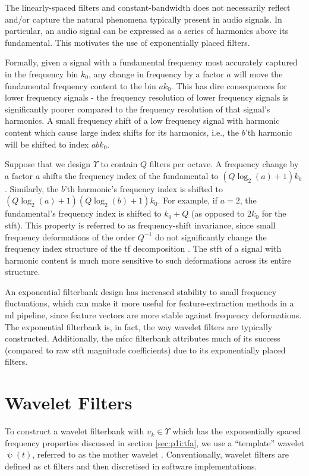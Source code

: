 The linearly-spaced filters and constant-bandwidth does not necessarily reflect and/or capture the natural phenomena typically present in audio signals. In particular, an audio signal can be expressed as a series of harmonics above its fundamental. This motivates the use of exponentially placed filters.

Formally, given a signal with a fundamental frequency most accurately captured in the frequency bin $k_0$, any change in frequency by a factor $a$ will move the fundamental frequency content to the bin $a k_0$. This has dire consequences for lower frequency signals - the frequency resolution of lower frequency signals is significantly poorer compared to the frequency resolution of that signal's harmonics. A small frequency shift of a low frequency signal with harmonic content which cause large index shifts for its harmonics, i.e., the $b$'th harmonic will be shifted to index $a b k_0$.

Suppose that we design $\Upsilon$ to contain $Q$ filters per octave. A frequency change by a factor $a$ shifts the frequency index of the fundamental to $(Q\log_2 (a) + 1) k_0$. Similarly, the $b$'th harmonic's frequency index is shifted to $(Q\log_2 (a) + 1) (Q\log_2 (b) + 1) k_0$. For example, if $a=2$, the fundamental's frequency index is shifted to $k_0 + Q$ (as opposed to $2 k_0$ for the \ac{stft}). This property is referred to as frequency-shift invariance, since small frequency deformations of the order $Q^{-1}$ do not significantly change the frequency index structure of the \ac{tf} decomposition \citep{1dscattering1}. The \ac{stft} of a signal with harmonic content is much more sensitive to such deformations across its entire structure.

An exponential filterbank design has increased stability to small frequency fluctuations, which can make it more useful for feature-extraction methods in a \ac{ml} pipeline, since feature vectors are more stable against frequency deformations. The exponential filterbank is, in fact, the way wavelet filters are typically constructed. Additionally, the \ac{mfcc} filterbank attributes much of its success (compared to raw \ac{stft} magnitude coefficients) due to its exponentially placed filters.

\section{Wavelet Filters}
\label{sec:p1i:wavelets}

To construct a wavelet filterbank with $\upsilon_k \in \Upsilon$ which has the exponentially spaced fre\-quency properties discussed in section \ref{sec:p1i:tfa}, we use a ``template'' wavelet $\uppsi(t)$, referred to as the mother wavelet \cite{waveletbook}. Conventionally, wavelet filters are defined as \ac{ct} filters and then discretised in software implementations. 

